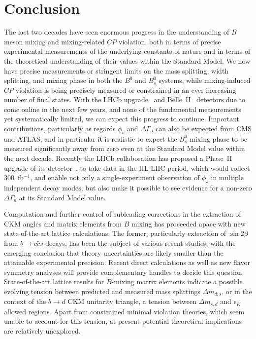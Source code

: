 \section{Conclusion}
The last two decades have seen enormous progress in the understanding of $B$ meson mixing and mixing-related
$CP$ violation, both in terms of precise experimental measurements of the underlying constants of nature and in terms of 
the theoretical understanding of their values within the Standard Model. We now have precise measurements 
or stringent limits on the mass splitting, width splitting, and mixing phase in both the $B^0$ and $B^0_s$ systems,
while mixing-induced $CP$ violation is being precisely measured or constrained in an ever increasing number of final states.
With the LHCb upgrade~\cite{Bediaga:1443882} and Belle~II~\cite{Abe:2010gxa} detectors due to come online in the next few years,
and none of the fundamental measurements
yet systematically limited, we can expect this progress to continue. Important contributions, particularly as regards
$\phi_s$ and $\Delta\Gamma_d$ can also be expected from CMS and ATLAS, and in particular it is realistic to expect the $B^0_s$ mixing
phase to be measured significantly away from zero even at the Standard Model value within the next decade. Recently
the LHCb collaboration has proposed a Phase~II upgrade of its detector~\cite{Aaij:2244311}, to take data in the HL-LHC period,
which would collect 300~fb$^{-1}$, and enable not only a single-experiment observation of $\phi_s$ in multiple independent
decay modes, but also make it possible to see evidence for a non-zero $\Delta\Gamma_d$ at its Standard Model value.

Computation and further control of subleading corrections in the extraction of CKM angles and matrix elements from $B$ mixing has proceeded apace with new state-of-the-art lattice calculations. The former, particularly extraction of $\sin 2\beta$ from $b \to c\bar{c} s$ decays, has been the subject of various recent studies, with the emerging conclusion that theory uncertainties are likely smaller than the attainable experimental precision. Recent direct calculations as well as new flavor symmetry analyses will provide complementary handles to decide this question. State-of-the-art lattice results for $B$-mixing matrix elements indicate a possible evolving tension between predicted and measured mass splittings $\Delta m_{d,s}$, or in the context of the $b \to d$ CKM unitarity triangle, a tension between $\Delta m_{s,d}$ and $\epsilon_K$ allowed regions. Apart from constrained minimal violation theories, which seem unable to account for this tension, at present potential theoretical implications are relatively unexplored. 

